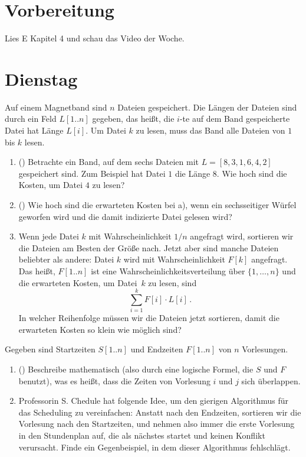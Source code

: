 \documentclass{uebung_cs}
\begin{document}
\section*{Vorbereitung}
Lies E Kapitel 4 und schau das Video der Woche.

\section*{Dienstag}
\begin{aufgabe}
    Auf einem Magnetband sind $n$ Dateien gespeichert.
    Die Längen der Dateien sind durch ein Feld $L[1..n]$ gegeben, das heißt, die $i$-te auf dem Band gespeicherte Datei hat Länge $L[i]$.
    Um Datei $k$ zu lesen, muss das Band alle Dateien von $1$ bis $k$ lesen.
    \begin{enumerate}
        \item(\warmup) Betrachte ein Band, auf dem sechs Dateien mit $L=[8,3,1,6,4,2]$ gespeichert sind. Zum Beispiel hat Datei $1$ die Länge $8$.
        Wie hoch sind die Kosten, um Datei $4$ zu lesen?
        \item(\warmup) Wie hoch sind die erwarteten Kosten bei a), wenn ein sechsseitiger Würfel geworfen wird und die damit indizierte Datei gelesen wird?
        \item Wenn jede Datei $k$ mit Wahrscheinlichkeit $1/n$ angefragt wird, sortieren wir die Dateien am Besten der Größe nach. Jetzt aber sind manche Dateien beliebter als andere: Datei $k$ wird mit Wahrscheinlichkeit $F[k]$ angefragt. Das heißt, $F[1..n]$ ist eine Wahrscheinlichkeitsverteilung über $\{1,\dots,n\}$ und die erwarteten Kosten, um Datei~$k$ zu lesen, sind
        \[\sum_{i=1}^k F[i]\cdot L[i]\,.\]
        In welcher Reihenfolge müssen wir die Dateien jetzt sortieren, damit die erwarteten Kosten so klein wie möglich sind?
    \end{enumerate}
\end{aufgabe}


\begin{aufgabe}[Scheduling]
    Gegeben sind Startzeiten $S[1..n]$ und Endzeiten $F[1..n]$ von $n$ Vorlesungen.
    \begin{enumerate}
        \item(\warmup) Beschreibe mathematisch (also durch eine logische Formel, die $S$ und $F$ benutzt), was es heißt, dass die Zeiten von Vorlesung $i$ und $j$ sich überlappen.
        \item Professorin S. Chedule hat folgende Idee, um den gierigen Algorithmus für das Scheduling zu vereinfachen: Anstatt nach den Endzeiten, sortieren wir die Vorlesung nach den Startzeiten, und nehmen also immer die erste Vorlesung in den Stundenplan auf, die als nächstes startet und keinen Konflikt verursacht. Finde ein Gegenbeispiel, in dem dieser Algorithmus fehlschlägt.
    \end{enumerate}
\end{aufgabe}
\end{document}

